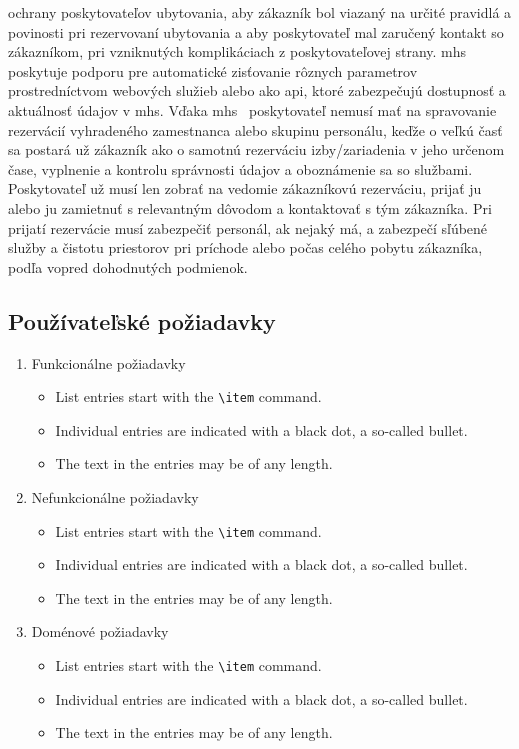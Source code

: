 ochrany poskytovateľov ubytovania, aby zákazník bol viazaný na určité pravidlá 
a povinosti pri rezervovaní ubytovania a aby poskytovateľ mal zaručený kontakt so 
zákazníkom, pri vzniknutých komplikáciach z poskytovateľovej strany.
\acrshort{mhs} poskytuje podporu pre automatické zisťovanie rôznych parametrov 
prostredníctvom webových služieb alebo ako \acrfull{api}, ktoré 
zabezpečujú dostupnosť a aktuálnosť údajov v \acrshort{mhs}.
Vďaka \acrshort{mhs} \projectName\ poskytovateľ nemusí mať na spravovanie 
rezervácií vyhradeného zamestnanca alebo skupinu personálu, keďže o veľkú časť 
sa postará už zákazník ako o samotnú rezerváciu izby/zariadenia v jeho 
určenom čase, vyplnenie a kontrolu správnosti údajov a oboznámenie sa so 
službami. Poskytovateľ už musí len zobrať na vedomie zákazníkovú rezerváciu, 
prijať ju alebo ju zamietnuť s relevantným dôvodom a kontaktovať s tým 
zákazníka. Pri prijatí rezervácie musí zabezpečiť personál, ak nejaký má, a 
zabezpečí sľúbené služby a čistotu priestorov pri príchode alebo počas celého 
pobytu zákazníka, podľa vopred dohodnutých podmienok.

\newpage
\subsection{Používateľské požiadavky}
\begin{enumerate}[label=\Alph*]
    \item Funkcionálne požiadavky
    \begin{itemize}
        \item List entries start with the \verb|\item| command.
        \item Individual entries are indicated with a black dot, a so-called bullet.
        \item The text in the entries may be of any length.
    \end{itemize}
    \item Nefunkcionálne požiadavky
    \begin{itemize}
        \item List entries start with the \verb|\item| command.
        \item Individual entries are indicated with a black dot, a so-called bullet.
        \item The text in the entries may be of any length.
    \end{itemize}
    \item Doménové požiadavky
    \begin{itemize}
        \item List entries start with the \verb|\item| command.
        \item Individual entries are indicated with a black dot, a so-called bullet.
        \item The text in the entries may be of any length.
    \end{itemize}
\end{enumerate}

